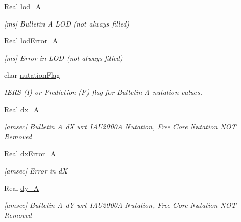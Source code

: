 \begin{DoxyCompactItemize}
Real \hyperlink{structlibrary_1_1physics_1_1coord_1_1frame_1_1provider_1_1iers_1_1_finals2000_a_1_1_data_afbf07c4c02bf6beb8c94241bae545067}{lod\+\_\+A}
\begin{DoxyCompactList}\small\item\em \mbox{[}ms\mbox{]} Bulletin A L\+OD (not always filled) \end{DoxyCompactList}\item 
Real \hyperlink{structlibrary_1_1physics_1_1coord_1_1frame_1_1provider_1_1iers_1_1_finals2000_a_1_1_data_a195e698f0d1e3c2bebdd52fe50600bad}{lod\+Error\+\_\+A}
\begin{DoxyCompactList}\small\item\em \mbox{[}ms\mbox{]} Error in L\+OD (not always filled) \end{DoxyCompactList}\item 
char \hyperlink{structlibrary_1_1physics_1_1coord_1_1frame_1_1provider_1_1iers_1_1_finals2000_a_1_1_data_abf0e07b72aafcc232e385a832fe4cc8f}{nutation\+Flag}
\begin{DoxyCompactList}\small\item\em I\+E\+RS (I) or Prediction (P) flag for Bulletin A nutation values. \end{DoxyCompactList}\item 
Real \hyperlink{structlibrary_1_1physics_1_1coord_1_1frame_1_1provider_1_1iers_1_1_finals2000_a_1_1_data_a704ec10ae45abab5416d1406ce713f96}{dx\+\_\+A}
\begin{DoxyCompactList}\small\item\em \mbox{[}amsec\mbox{]} Bulletin A dX wrt I\+A\+U2000A Nutation, Free Core Nutation N\+OT Removed \end{DoxyCompactList}\item 
Real \hyperlink{structlibrary_1_1physics_1_1coord_1_1frame_1_1provider_1_1iers_1_1_finals2000_a_1_1_data_aae23ff1f9d5d4f111929bb36ddf5c38b}{dx\+Error\+\_\+A}
\begin{DoxyCompactList}\small\item\em \mbox{[}amsec\mbox{]} Error in dX \end{DoxyCompactList}\item 
Real \hyperlink{structlibrary_1_1physics_1_1coord_1_1frame_1_1provider_1_1iers_1_1_finals2000_a_1_1_data_aca5aeb05f1d26dc623a6fe1453f7eb50}{dy\+\_\+A}
\begin{DoxyCompactList}\small\item\em \mbox{[}amsec\mbox{]} Bulletin A dY wrt I\+A\+U2000A Nutation, Free Core Nutation N\+OT Removed \end{DoxyCompactList}\item 

\end{DoxyCompactItemize}
